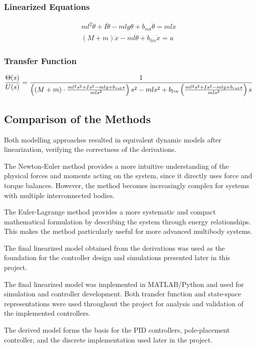 \subsubsection{Linearized Equations}

\begin{align}
	ml^2\ddot{\theta}+I\ddot{\theta}-mlg\theta+b_{rot}\dot{\theta}=ml\ddot{x} \\
	(M+m)\ddot{x}-ml\ddot{\theta}+b_{lin}\dot{x}=u
\end{align}

\subsubsection{Transfer Function}

\begin{equation}
	\small
	\frac{\Theta(s)}{U(s)}
	=
	\frac{1}
	{
		\left(
		(M+m)
		\cdot
		\frac{
			ml^2s^2 + Is^2 - mlg + b_{rot}s
		}{
			mls^2
		}
		\right)
		s^2
		-
		mls^2
		+
		b_{lin}
		\left(
		\frac{
			ml^2s^2 + Is^2 - mlg + b_{rot}s
		}{
			mls^2
		}
		\right)
		s
	}
\end{equation}

\subsection{Comparison of the Methods}

Both modelling approaches resulted in equivalent dynamic models after linearization, verifying the correctness of the derivations.

The Newton-Euler method provides a more intuitive understanding of the physical forces and moments acting on the system, since it directly uses force and torque balances. However, the method becomes increasingly complex for systems with multiple interconnected bodies.

The Euler-Lagrange method provides a more systematic and compact mathematical formulation by describing the system through energy relationships. This makes the method particularly useful for more advanced multibody systems.

The final linearized model obtained from the derivations was used as the foundation for the controller design and simulations presented later in this project.

The final linearized model was implemented in MATLAB/Python and used for simulation and controller development. Both transfer function and state-space representations were used throughout the project for analysis and validation of the implemented controllers.

The derived model forms the basis for the PID controllers, pole-placement controller, and the discrete implementation used later in the project.